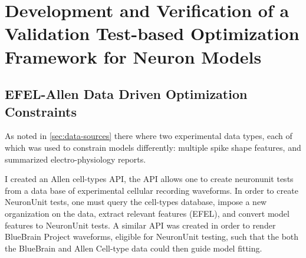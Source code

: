 \section{Development and Verification of a Validation Test-based Optimization Framework for Neuron Models}





\subsection{EFEL-Allen Data Driven Optimization Constraints}

As noted in \ref{sec:data-sources} there where two experimental data types, each of which was used to constrain models differently: multiple spike shape features, and summarized electro-physiology reports.

I created an Allen cell-types API, the API allows one to create neuronunit tests from a data base of experimental cellular recording waveforms. In order to create NeuronUnit tests, one must query the cell-types database, impose a new organization on the data, extract relevant features (EFEL), and convert model features to NeuronUnit tests. A similar API was created in order to render BlueBrain Project waveforms, eligible for NeuronUnit testing, such that the both the BlueBrain \cite{toledo} and Allen Cell-type data could then guide model fitting. %

